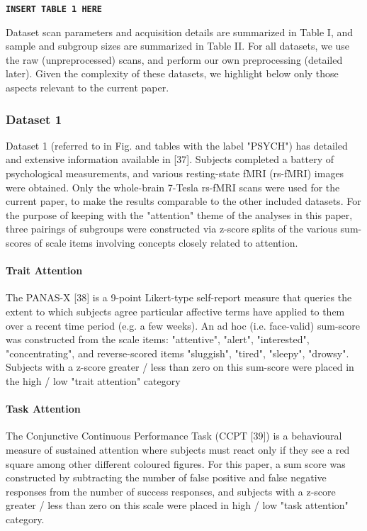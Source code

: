 \begin{center}
\texttt{\textbf{INSERT TABLE 1 HERE}}
\end{center}

Dataset scan parameters and acquisition details are summarized in Table I, and sample and subgroup
sizes are summarized in Table II. For all datasets, we use the raw (unpreprocessed) scans, and
perform our own preprocessing (detailed later). Given the complexity of these datasets, we highlight
below only those aspects relevant to the current paper.

\subsubsection{Dataset 1}
Dataset 1 (referred to in Fig. and tables with the label "PSYCH") has detailed and extensive
information available in  [37]. Subjects completed a battery of psychological measurements, and
various resting-state fMRI (rs-fMRI) images were obtained. Only the whole-brain 7-Tesla rs-fMRI
scans were used for the current paper, to make the results comparable to the other included
datasets. For the purpose of keeping with the "attention" theme of the analyses in this paper, three
pairings of subgroups were constructed via z-score splits of the various sum-scores of scale items
involving concepts closely related to attention.

\paragraph{Trait Attention}
The PANAS-X [38] is a 9-point Likert-type self-report measure that queries the extent to which
subjects agree particular affective terms have applied to them over a recent time period (e.g. a few
weeks). An ad hoc (i.e. face-valid) sum-score was constructed from the scale items: "attentive",
"alert", "interested", "concentrating", and reverse-scored items "sluggish", "tired", "sleepy",
"drowsy". Subjects with a z-score greater / less than zero on this sum-score were placed in the high
/ low "trait attention" category

\paragraph{Task Attention}
The Conjunctive Continuous Performance Task (CCPT [39]) is a behavioural measure of sustained
attention where subjects must react only if they see a red square among other different coloured
figures. For this paper, a sum score was constructed by subtracting the number of false positive and
false negative responses from the number of success responses, and subjects with a z-score greater /
less than zero on this scale were placed in high / low "task attention" category.

